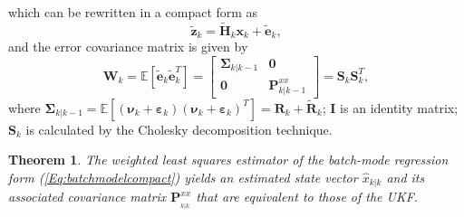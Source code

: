 \documentclass[10pt]{IEEEtran}
\newtheorem{theorem}{Theorem}
\begin{document}
which can be rewritten in a compact form as
\begin{equation}
{\bm{\widetilde z}_k} = {\bm{\widetilde H}_k}{\bm{x}_k} + {\bm{\widetilde e}_k},
\label{Eq:batchmodelcompact}
\end{equation}
and the error covariance matrix is given by
\begin{equation}
\bm{W}_k=\mathbb{E}\left[ {{{\bm{\widetilde e}}_k}\bm{\widetilde e}_k^T} \right] = \left[ {\begin{array}{*{20}{c}}
{{\bm{\Sigma} _{k\left| {k - 1} \right.}}}&\bm{0}\\
\bm{0}&{{\bm{P} _{k\left| {k - 1} \right.}^{xx}}}
\end{array}} \right] = {\bm{S}_k}\bm{S}_k^T,
\label{Eq:batchmodelcompactcovariance}
\end{equation}
where ${\bm{\Sigma}_{k| {k - 1}}} = \mathbb{E}[ {( {{\bm{\nu} _k} + {\bm{\varepsilon}_k}}){{( {{\bm{\nu}_k} + {\bm{\varepsilon}_k}})}^T}}]=\bm{R}_k+\bm{\widetilde{R}}_k$; $\bm{I}$ is an identity matrix; $\bm{S}_k$ is calculated by the Cholesky decomposition technique.
\begin{theorem}
The weighted least squares estimator of the batch-mode regression form (\ref{Eq:batchmodelcompact})
yields an estimated state vector ${{{\widehat x}_{k|{k}}}}$ and its associated covariance matrix $\bm{P}_{_{k|{k}}}^{xx}$ that are equivalent to those of the UKF.
\end{theorem}
\end{document}
